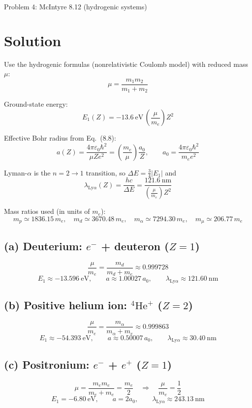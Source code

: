 \documentclass{article}
\begin{document}
\newpage

{\huge Problem 4: McIntyre 8.12 (hydrogenic systems)}

\section*{Solution}

Use the hydrogenic formulas (nonrelativistic Coulomb model) with reduced mass $\mu$:
\[
\mu=\frac{m_1 m_2}{m_1+m_2}
\]

Ground-state energy:
\[
E_1(Z)=-13.6~\text{eV}\,\left(\frac{\mu}{m_e}\right)Z^2
\]

Effective Bohr radius from Eq.\ (8.8):
\[
a(Z)=\frac{4\pi\varepsilon_0\hbar^2}{\mu Z e^2}
=\left(\frac{m_e}{\mu}\right)\frac{a_0}{Z},
\qquad
a_0=\frac{4\pi\varepsilon_0\hbar^2}{m_e e^2}
\]

Lyman-$\alpha$ is the $n=2\to 1$ transition, so $\Delta E=\frac{3}{4}|E_1|$ and
\[
\lambda_{\mathrm{Ly}\alpha}(Z)
=\frac{hc}{\Delta E}
=\frac{121.6~\text{nm}}{\left(\frac{\mu}{m_e}\right)Z^2}
\]

Mass ratios used (in units of $m_e$): 
\[
m_p\simeq 1836.15\,m_e,\quad
m_d\simeq 3670.48\,m_e,\quad
m_\alpha\simeq 7294.30\,m_e,\quad
m_\mu\simeq 206.77\,m_e
\]

\subsection*{(a) Deuterium: $e^-$ + deuteron ($Z=1$)}
\[
\frac{\mu}{m_e}=\frac{m_d}{m_d+m_e}\approx 0.999728
\]
\[
E_1\approx -13.596~\text{eV},\qquad
a\approx 1.00027\,a_0,\qquad
\lambda_{\mathrm{Ly}\alpha}\approx 121.60~\text{nm}
\]

\subsection*{(b) Positive helium ion: ${}^{4}\mathrm{He}^+$ ($Z=2$)}
\[
\frac{\mu}{m_e}=\frac{m_\alpha}{m_\alpha+m_e}\approx 0.999863
\]
\[
E_1\approx -54.393~\text{eV},\qquad
a\approx 0.50007\,a_0,\qquad
\lambda_{\mathrm{Ly}\alpha}\approx 30.40~\text{nm}
\]

\subsection*{(c) Positronium: $e^-$ + $e^+$ ($Z=1$)}
\[
\mu=\frac{m_e m_e}{m_e+m_e}=\frac{m_e}{2}
\quad\Rightarrow\quad
\frac{\mu}{m_e}=\frac{1}{2}
\]
\[
E_1= -6.80~\text{eV},\qquad
a=2a_0,\qquad
\lambda_{\mathrm{Ly}\alpha}\approx 243.13~\text{nm}
\]
\end{document}
